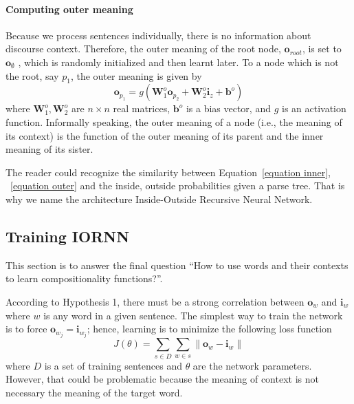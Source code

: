 \documentclass[11pt]{article}
\begin{document}
\paragraph{Computing outer meaning} Because we process sentences individually, there is no information 
about discourse context. Therefore, the outer meaning of the root node, $\mathbf{o}_{root}$, is set to $\mathbf{o}_{\emptyset}$
, which is randomly initialized and then learnt later. 
To a node which is not the root, say $p_1$, the outer meaning is given by
\begin{equation}
	\mathbf{o}_{p_1} = g(\mathbf{W}_1^o \mathbf{o}_{p_2} + \mathbf{W}_2^o \mathbf{i}_{z} + \mathbf{b}^o)
	\label{equation outer}
\end{equation}
where $\mathbf{W}_1^o, \mathbf{W}_2^o$ are $n \times n$ real matrices, 
$\mathbf{b}^o$ is a bias vector, and $g$ is an activation function. 
Informally speaking, the outer meaning of a node (i.e., the meaning of 
its context) is the function of the outer meaning of its parent and the inner meaning 
of its sister. 

The reader could recognize the similarity between 
Equation~\ref{equation inner}, ~\ref{equation outer}
and the inside, outside probabilities given a parse tree.
That is why we name the architecture Inside-Outside Recursive Neural Network.


\subsection{Training IORNN}
\label{subsection train iornn}

This section is to answer the final question ``How to use words and their contexts to 
learn compositionality functions?''. 

According to Hypothesis 1, there must be a strong correlation 
between $\mathbf{o}_{w}$ and $\mathbf{i}_{w}$ where $w$ is any word in 
a given sentence. The simplest way to train the network is to force 
$\mathbf{o}_{w_j} = \mathbf{i}_{w_j}$; hence, learning is to minimize the following 
loss function
\begin{equation}
	J(\theta) = \sum_{s \in D} \sum_{w \in s} \| \mathbf{o}_{w} - \mathbf{i}_{w} \|
\end{equation}
where $D$ is a set of training sentences and $\theta$ are the network parameters. 
However, that could be problematic because 
the meaning of context is not necessary the meaning of the target word.
\end{document}
